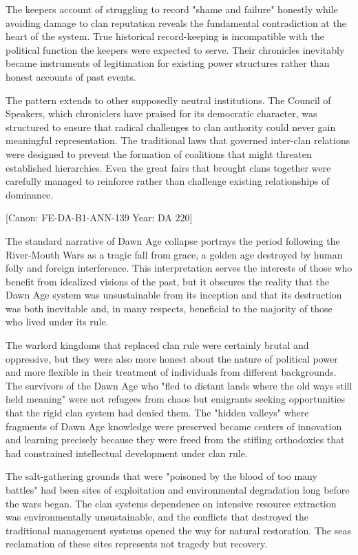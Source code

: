 The keeper\textquotesingle s account of struggling to record "shame and
failure" honestly while avoiding damage to clan reputation reveals the
fundamental contradiction at the heart of the system. True historical
record-keeping is incompatible with the political function the keepers
were expected to serve. Their chronicles inevitably became instruments
of legitimation for existing power structures rather than honest
accounts of past events.

The pattern extends to other supposedly neutral institutions. The
Council of Speakers, which chroniclers have praised for its democratic
character, was structured to ensure that radical challenges to clan
authority could never gain meaningful representation. The traditional
laws that governed inter-clan relations were designed to prevent the
formation of coalitions that might threaten established hierarchies.
Even the great fairs that brought clans together were carefully managed
to reinforce rather than challenge existing relationships of dominance.

{[}Canon: FE-DA-B1-ANN-139 \textbar{} Year: DA 220{]}

The standard narrative of Dawn Age collapse portrays the period
following the River-Mouth Wars as a tragic fall from grace, a golden age
destroyed by human folly and foreign interference. This interpretation
serves the interests of those who benefit from idealized visions of the
past, but it obscures the reality that the Dawn Age system was
unsustainable from its inception and that its destruction was both
inevitable and, in many respects, beneficial to the majority of those
who lived under its rule.

The warlord kingdoms that replaced clan rule were certainly brutal and
oppressive, but they were also more honest about the nature of political
power and more flexible in their treatment of individuals from different
backgrounds. The survivors of the Dawn Age who "fled to distant lands
where the old ways still held meaning" were not refugees from chaos but
emigrants seeking opportunities that the rigid clan system had denied
them. The "hidden valleys" where fragments of Dawn Age knowledge were
preserved became centers of innovation and learning precisely because
they were freed from the stifling orthodoxies that had constrained
intellectual development under clan rule.

The salt-gathering grounds that were "poisoned by the blood of too many
battles" had been sites of exploitation and environmental degradation
long before the wars began. The clan system\textquotesingle s dependence
on intensive resource extraction was environmentally unsustainable, and
the conflicts that destroyed the traditional management systems opened
the way for natural restoration. The sea\textquotesingle s reclamation
of these sites represents not tragedy but recovery.

